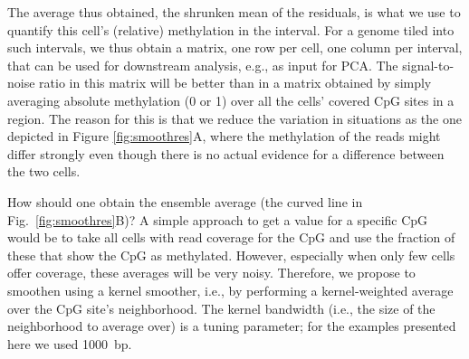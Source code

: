 \documentclass[twocolumn,10pt]{article}
\begin{document}
The average thus obtained, the shrunken mean of the residuals, is what we use to quantify this cell's (relative) methylation in the interval.
For a genome tiled into such intervals, we thus obtain a matrix, one row per cell, one column per interval, that can be used for downstream analysis, e.g., as input for PCA.
The signal-to-noise ratio in this matrix will be better than in a matrix obtained by simply averaging absolute methylation (0 or 1) over all the cells' covered CpG sites in a region.
The reason for this is that we reduce the variation in situations as the one depicted in Figure \ref{fig:smoothres}A, where the methylation of the reads might differ strongly even though there is no actual evidence for a difference between the two cells.

How should one obtain the ensemble average (the curved line in Fig.~\ref{fig:smoothres}B)?
A simple approach to get a value for a specific CpG would be to take all cells with read coverage for the CpG and use the fraction of these that show the CpG as methylated.
However, especially when only few cells offer coverage, these averages will be very noisy.
Therefore, we propose to smoothen using a kernel smoother, i.e., by performing a kernel-weighted average over the CpG site's neighborhood.
The kernel bandwidth (i.e., the size of the neighborhood to average over) is a tuning parameter; for the examples presented here we used 1000~bp.


\end{document}
